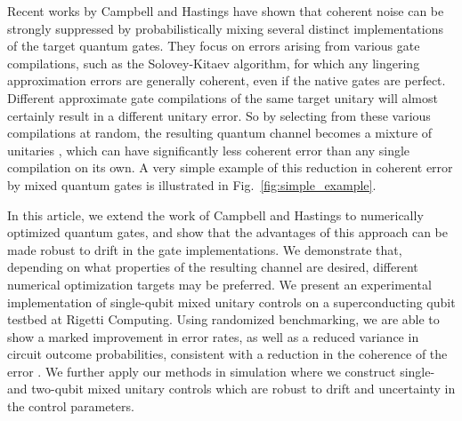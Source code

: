 \documentclass[aps,nofootinbib,pra,notitlepage,twocolumn]{revtex4-1}
\begin{document}
Recent works by Campbell \cite{Campbell2017,1811.08017} and Hastings \cite{Hastings2017} have shown that coherent noise can be strongly suppressed by probabilistically mixing several distinct implementations of the target quantum gates. They focus on errors arising from various gate compilations, such as the Solovey-Kitaev algorithm, for which any lingering approximation errors are generally coherent, even if the native gates are perfect. Different approximate gate compilations of the same target unitary will almost certainly result in a different unitary error. So by selecting from these various compilations at random, the resulting quantum channel becomes a mixture of unitaries \cite{DBLP:journals/corr/cs-CC-0012017}, which can have significantly less coherent error than any single compilation on its own. A very simple example of this reduction in coherent error by mixed quantum gates is illustrated in Fig.~\ref{fig:simple_example}. 

In this article, we extend the work of Campbell and Hastings to numerically optimized quantum gates, and show that the advantages of this approach can be made robust to drift in the gate implementations. We demonstrate that, depending on what properties of the resulting channel are desired, different numerical optimization targets may be preferred. We present an experimental implementation of single-qubit mixed unitary controls on a superconducting qubit testbed at Rigetti Computing. Using randomized benchmarking, we are able to show a marked improvement in error rates, as well as a reduced variance in circuit outcome probabilities, consistent with a reduction in the coherence of the error \cite{Ball2016}. We further apply our methods in simulation where we construct single- and two-qubit mixed unitary controls which are robust to drift and uncertainty in the control parameters.


% 
% 




\end{document}
